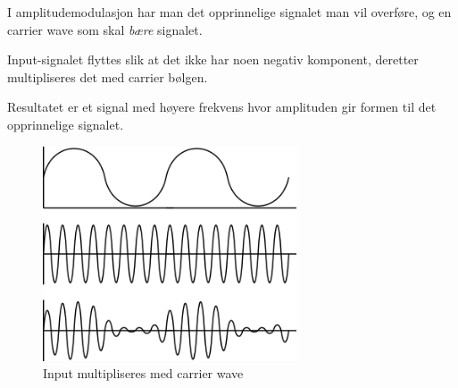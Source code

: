 I amplitudemodulasjon har man det opprinnelige signalet man vil overføre,
og en carrier wave som skal \emph{bære} signalet.

Input-signalet flyttes slik at det ikke har noen negativ komponent,
deretter multipliseres det med carrier bølgen.

Resultatet er et signal med høyere frekvens hvor amplituden gir formen
til det opprinnelige signalet.

\begin{figure}[H]
  \centering
  \includegraphics[width=0.67\textwidth]{./img/am}
  \caption{Input multipliseres med carrier wave}
\end{figure}
